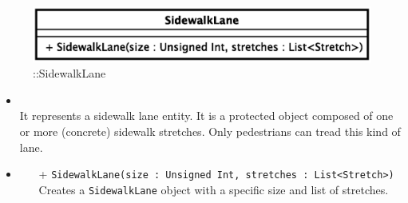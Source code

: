 \begin{figure}[h]
\centering
\includegraphics[scale=0.6,keepaspectratio]{images/solution/app/backend/sidewalk_lane.eps}
\caption{\pReactiveComponentLane::SidewalkLane}
\label{fig:sd-app-sidewalk_lane}
\end{figure}
\FloatBarrier
\begin{itemize}
  \item \textbf{\descr} \\
    It represents a sidewalk lane entity. It is a protected object composed of
    one or more (concrete) sidewalk stretches. Only pedestrians can tread this
    kind of lane.
  \item \textbf{\ops}
  \begin{itemize}
  \item[+] \texttt{SidewalkLane(size : Unsigned Int, stretches : List<Stretch>)} \\
  Creates a \texttt{SidewalkLane} object with a specific size and list of stretches.
  \end{itemize}
\end{itemize}
